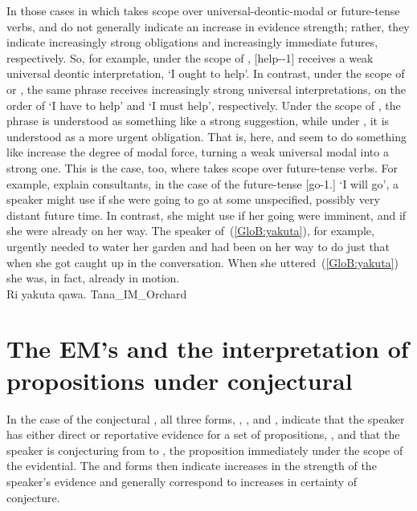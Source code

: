 In those cases in which  takes scope over universal-deontic-modal or future-tense verbs,  and  do not generally indicate an increase in evidence strength; rather, they indicate increasingly strong obligations and increasingly immediate futures, respectively. So, for example, under the scope of ,  [help--1] receives a weak universal deontic interpretation, ‘I ought to help’. In contrast, under the scope of  or , the same phrase receives increasingly strong universal interpretations, on the order of ‘I have to help’ and ‘I must help’, respectively. Under the scope of , the phrase is understood as something like a strong suggestion, while under , it is understood as a more urgent obligation. That is, here,  and  seem to do something like increase the degree of modal force, turning a weak universal modal into a strong one. This is the case, too, where  takes scope over future-tense verbs. For example, explain consultants, in the case of the future-tense  [go-1.] ‘I will go’, a speaker might use if she were going to go at some unspecified, possibly very distant future time. In contrast, she might use  if her going were imminent, and  if she were already on her way. The speaker of~(\ref{GloB:yakuta}), for example, urgently needed to water her garden and had been on her way to do just that when she got caught up in the conversation. When she uttered~(\ref{GloB:yakuta}) she was, in fact, already in motion.\\

%
{Ri yakuta qawa.}%
{}%
{Tana\_IM\_Orchard}{}%

\section{The EM’s and the interpretation of propositions under conjectural }
In the case of the conjectural , all three forms, , , and , indicate that the speaker has either direct or reportative evidence for a set of propositions, , and that the speaker is conjecturing from  to , the proposition immediately under the scope of the evidential. The  and  forms then indicate increases in the strength of the speaker’s evidence and generally correspond to increases in certainty of conjecture.

